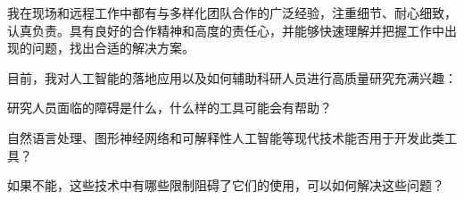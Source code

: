 

\begin{cvparagraph}

我在现场和远程工作中都有与多样化团队合作的广泛经验，注重细节、耐心细致，认真负责。具有良好的合作精神和高度的责任心，并能够快速理解并把握工作中出现的问题，找出合适的解决方案。

目前，我对人工智能的落地应用以及如何辅助科研人员进行高质量研究充满兴趣：
\\
\begin{cvitems}
    \item{研究人员面临的障碍是什么，什么样的工具可能会有帮助？}
    \item {自然语言处理、图形神经网络和可解释性人工智能等现代技术能否用于开发此类工具？}
    \item {如果不能，这些技术中有哪些限制阻碍了它们的使用，可以如何解决这些问题？}
\end{cvitems}

\end{cvparagraph}
